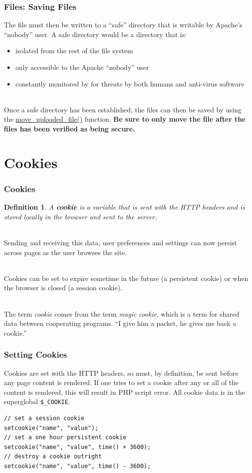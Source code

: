 \documentclass[aspectratio=169]{beamer}
\newtheorem{defn}{Definition}
\begin{document}
\begin{frame}
\frametitle{Files: Saving Files}
The file must then be written to a ``safe'' directory that is writable by Apache's ``nobody'' user. A safe directory would be a directory that is:
\begin{itemize}
	\item isolated from the rest of the file system
	\item only accessible to the Apache ``nobody'' user
	\item constantly monitored by for threats by both humans and anti-virus software
\end{itemize}
\pause
\mbox{}\\
Once a safe directory has been established, the files can then be saved by using the \href{http://us.php.net/manual/en/function.move-uploaded-file.php}{move\_uploaded\_file()} function. \textbf{Be sure to only move the file after the files has been verified as being secure.}
\end{frame}

\section{Cookies}
\begin{frame}
\frametitle{Cookies}
\begin{defn}
A \textbf{cookie} is a variable that is sent with the HTTP headers and is stored locally in the browser and sent to the server.
\end{defn}

\mbox{}\\
Sending and receiving this data, user preferences and settings can now persist across pages as the user browses the site.

\mbox{}\\
Cookies can be set to expire sometime in the future (a persistent cookie) or when the browser is closed (a session cookie).

\mbox{}\\
The term \textit{cookie} comes from the term \textit{magic cookie}, which is a term for shared data between cooperating programs. ``I give him a packet, he gives me back a cookie.'' \cite{jargon}
\end{frame}

\begin{frame}[fragile]
\frametitle{Setting Cookies}
Cookies are set with the HTTP headers, so must, by definition, be sent before any page content is rendered. If one tries to set a cookie after any or all of the content is rendered, this will result in PHP script error. All cookie data is in the superglobal \texttt{\$\_COOKIE}.

\begin{lstlisting}[caption=Setting a Cookie,label=code:cookie]
// set a session cookie
setcookie("name", "value");
// set a one hour persistent cookie
setcookie("name", "value", time() + 3600);
// destroy a cookie outright
setcookie("name", "value", time() - 3600);
\end{lstlisting}
\end{frame}
\end{document}
